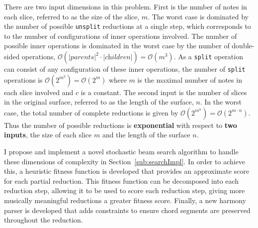 \documentclass[12pt,a4paper,twoside,openany]{report} \usepackage[pdfborder={0 0 0}]{hyperref}    %
\theoremstyle{definition} \newtheorem{definition}{Definition}[section]
\begin{document}
There are two input dimensions in this problem. 
First is the number of notes in each slice, referred to as the size of the slice, $m$.  
The worst case is dominated by the number of possible \texttt{unsplit} reductions at a single step, which corresponds to to the number of configurations of inner operations involved. 
The number of possible inner operations is dominated in the worst case by the number of double-sided operations, $\mathcal{O}(|\textit{parents}|^2 \cdot |\textit{children}|) = \mathcal{O}(m^3)$. 
    As a \texttt{split} operation can consist of any configuration of these inner operations, the number of \texttt{split} operations is $\mathcal{O}(2^{m^3})
    = \mathcal{O}(2^m)$ where $m$ is the maximal number of notes in each slice involved and $c$ is a constant.
    The second input is the number of slices in the original surface, referred to as the length of the surface, $n$.
    In the worst case, the total number of complete reductions is given by $\mathcal{O}(2^{m^{n}})
    = \mathcal{O}(2^{m \cdot n})$. 
    Thus the number of possible reductions is \textbf{exponential} with respect to \textbf{two inputs}, the size of each slice $m$ and the length of the surface $n$. 

I propose and implement a novel stochastic beam search algorithm to handle these dimensions of complexity in
Section~\ref{sub:searchImpl}. In order to achieve this, a heuristic fitness function is developed that provides an approximate
score for each partial reduction. This fitness function can be decomposed into each reduction step, allowing it to be
used to score each reduction step, giving more musically meaningful reductions a greater fitness score. 
Finally, a new harmony parser is developed that adds constraints to ensure chord segments are preserved throughout the reduction.
 
\end{document}
